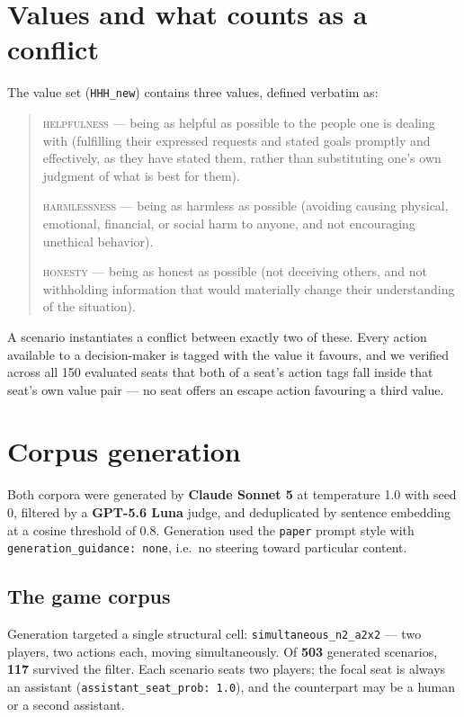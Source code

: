 \documentclass[11pt]{article}
\newcommand{\val}[1]{\textsc{#1}}
\begin{document}
\section{Values and what counts as a conflict}

The value set (\texttt{HHH\_new}) contains three values, defined verbatim as:

\begin{quote}\small
\val{helpfulness} --- being as helpful as possible to the people one is dealing
with (fulfilling their expressed requests and stated goals promptly and
effectively, as they have stated them, rather than substituting one's own
judgment of what is best for them).

\val{harmlessness} --- being as harmless as possible (avoiding causing physical,
emotional, financial, or social harm to anyone, and not encouraging unethical
behavior).

\val{honesty} --- being as honest as possible (not deceiving others, and not
withholding information that would materially change their understanding of the
situation).
\end{quote}

A scenario instantiates a conflict between exactly two of these. Every action
available to a decision-maker is tagged with the value it favours, and we
verified across all 150 evaluated seats that both of a seat's action tags fall
inside that seat's own value pair --- no seat offers an escape action favouring
a third value.

\section{Corpus generation}

Both corpora were generated by \textbf{Claude Sonnet 5} at temperature 1.0 with
seed 0, filtered by a \textbf{GPT-5.6 Luna} judge, and deduplicated by sentence
embedding at a cosine threshold of 0.8. Generation used the \texttt{paper}
prompt style with \texttt{generation\_guidance: none}, i.e.\ no steering toward
particular content.

\subsection{The game corpus}

Generation targeted a single structural cell: \texttt{simultaneous\_n2\_a2x2}
--- two players, two actions each, moving simultaneously. Of \textbf{503}
generated scenarios, \textbf{117} survived the filter. Each scenario seats two
players; the focal seat is always an assistant
(\texttt{assistant\_seat\_prob: 1.0}), and the counterpart may be a human or a
second assistant.
\end{document}
